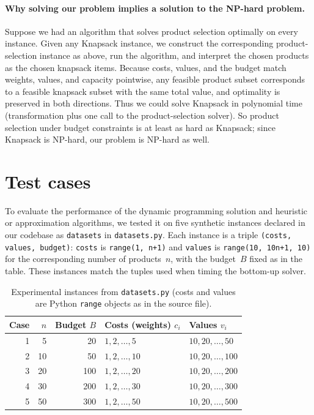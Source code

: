 \documentclass[11pt]{article}
\begin{document}
\paragraph{Why solving our problem implies a solution to the NP-hard problem.}
Suppose we had an algorithm that solves product selection optimally on every instance. Given any Knapsack instance, we construct the corresponding product-selection instance as above, run the algorithm, and interpret the chosen products as the chosen knapsack items. Because costs, values, and the budget match weights, values, and capacity pointwise, any feasible product subset corresponds to a feasible knapsack subset with the same total value, and optimality is preserved in both directions. Thus we could solve Knapsack in polynomial time (transformation plus one call to the product-selection solver). So product selection under budget constraints is at least as hard as Knapsack; since Knapsack is NP-hard, our problem is NP-hard as well.

\section{Test cases}

To evaluate the performance of the dynamic programming solution and heuristic or approximation algorithms, we tested it on five synthetic instances declared in our codebase as \texttt{datasets} in \texttt{datasets.py}. Each instance is a triple \texttt{(costs, values, budget)}: \texttt{costs} is \texttt{range(1, n+1)} and \texttt{values} is \texttt{range(10, 10n+1, 10)} for the corresponding number of products~$n$, with the budget~$B$ fixed as in the table. These instances match the tuples used when timing the bottom-up solver.

\begin{table}[htbp]
  \centering
  \caption{Experimental instances from \texttt{datasets.py} (costs and values are Python \texttt{range} objects as in the source file).}
  \label{tab:datasets}
  \begin{tabular}{r r r l l}
    \hline
    Case & $n$ & Budget $B$ & Costs (weights) $c_i$ & Values $v_i$ \\
    \hline
    1 & 5 & 20 & $1,2,\ldots,5$ & $10,20,\ldots,50$ \\
    2 & 10 & 50 & $1,2,\ldots,10$ & $10,20,\ldots,100$ \\
    3 & 20 & 100 & $1,2,\ldots,20$ & $10,20,\ldots,200$ \\
    4 & 30 & 200 & $1,2,\ldots,30$ & $10,20,\ldots,300$ \\
    5 & 50 & 300 & $1,2,\ldots,50$ & $10,20,\ldots,500$ \\
    \hline
  \end{tabular}
\end{table}
\end{document}
